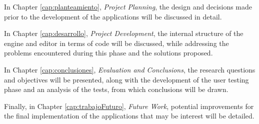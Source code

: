In Chapter \ref{cap:planteamiento}, \textit{Project Planning}, the design and decisions made prior to the development of the applications will be discussed in detail.

\medskip

In Chapter \ref{cap:desarrollo}, \textit{Project Development}, the internal structure of the engine and editor in terms of code will be discussed, while addressing the problems encountered during this phase and the solutions proposed.

\medskip

In Chapter \ref{cap:conclusiones}, \textit{Evaluation and Conclusions}, the research questions and objectives will be presented, along with the development of the user testing phase and an analysis of the tests, from which conclusions will be drawn.

\medskip

Finally, in Chapter \ref{cap:trabajoFuturo}, \textit{Future Work}, potential improvements for the final implementation of the applications that may be interest will be detailed.








